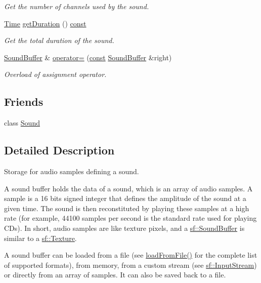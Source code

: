 \begin{DoxyCompactItemize}
\begin{DoxyCompactList}\small\item\em Get the number of channels used by the sound. \end{DoxyCompactList}\item 
\hyperlink{classsf_1_1_time}{Time} \hyperlink{classsf_1_1_sound_buffer_aee681c7a0f3dff4c4d0c9f8bbdb51bb0}{get\-Duration} () \hyperlink{term__entry_8h_a57bd63ce7f9a353488880e3de6692d5a}{const} 
\begin{DoxyCompactList}\small\item\em Get the total duration of the sound. \end{DoxyCompactList}\item 
\hyperlink{classsf_1_1_sound_buffer}{Sound\-Buffer} \& \hyperlink{classsf_1_1_sound_buffer_adcc786b60bbd95be1551368fafd274a7}{operator=} (\hyperlink{term__entry_8h_a57bd63ce7f9a353488880e3de6692d5a}{const} \hyperlink{classsf_1_1_sound_buffer}{Sound\-Buffer} \&right)
\begin{DoxyCompactList}\small\item\em Overload of assignment operator. \end{DoxyCompactList}\end{DoxyCompactItemize}
\subsection*{Friends}
\begin{DoxyCompactItemize}
\item 
class \hyperlink{classsf_1_1_sound_buffer_a78d488655886fd6a1355b1162fba927f}{Sound}
\end{DoxyCompactItemize}


\subsection{Detailed Description}
Storage for audio samples defining a sound. 

A sound buffer holds the data of a sound, which is an array of audio samples. A sample is a 16 bits signed integer that defines the amplitude of the sound at a given time. The sound is then reconstituted by playing these samples at a high rate (for example, 44100 samples per second is the standard rate used for playing C\-Ds). In short, audio samples are like texture pixels, and a \hyperlink{classsf_1_1_sound_buffer}{sf\-::\-Sound\-Buffer} is similar to a \hyperlink{classsf_1_1_texture}{sf\-::\-Texture}.

A sound buffer can be loaded from a file (see \hyperlink{classsf_1_1_sound_buffer_a2be6a8025c97eb622a7dff6cf2594394}{load\-From\-File()} for the complete list of supported formats), from memory, from a custom stream (see \hyperlink{classsf_1_1_input_stream}{sf\-::\-Input\-Stream}) or directly from an array of samples. It can also be saved back to a file.

